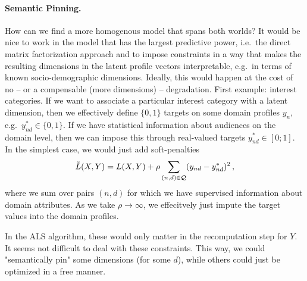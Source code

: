 \documentclass{article}
\begin{document}
\paragraph{Semantic Pinning.} How can we find a more homogenous model that spans both worlds? It would be nice to work in the model that has the largest predictive power, i.e.~the direct matrix factorization approach and to impose constraints in a way that makes the resulting dimensions in the latent profile vectors interpretable, e.g.~in terms of known socio-demographic dimensions. Ideally, this would happen at the cost of no -- or a compensable (more dimensions) -- degradation. First example: interest categories. If we want to associate a particular interest category with a latent dimension, then we effectively define $\{0,1\}$ targets on some domain profiles $y_n$, e.g.~$y^*_{nd} \in \{0,1\}$. If we have statistical information about audiences on the domain level, then we can impose this through real-valued targets $y^*_{nd} \in [0;1]$. In the simplest case, we would just add soft-penalties 
\begin{align}
\tilde L(X,Y) = L(X,Y) + \rho \sum_{(n,d) \in {\cal Q}} (y_{nd} - y_{nd}^*)^2\,,
\end{align}
where we sum over pairs $(n,d)$ for which we have supervised information  about domain attributes. As we take $\rho \to \infty$, we effecitvely just impute the target values into the domain profiles. 

In the ALS algorithm, these would only matter in the recomputation step for $Y$. It seems not difficult to deal with these constraints. This way, we could "semantically pin" some dimensions (for some $d$), while others could just be optimized in a free manner. 
 
\end{document}
